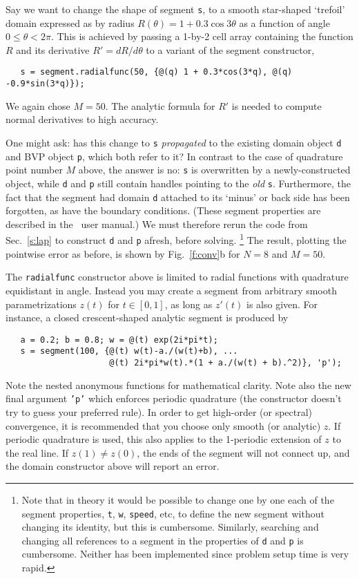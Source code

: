 Say we want to change the shape of segment {\tt s}, to
a smooth star-shaped `trefoil' domain expressed as by radius $R(\theta) =
1 + 0.3\cos 3\theta$ as a function of angle $0\le \theta< 2\pi$.
This is achieved by passing a 1-by-2
cell array containing the function $R$ and its
derivative $R' = dR/d\theta$ to a variant of the segment constructor,
\begin{verbatim}
   s = segment.radialfunc(50, {@(q) 1 + 0.3*cos(3*q), @(q) -0.9*sin(3*q)});
\end{verbatim}
We again chose $M=50$.
The analytic formula for $R'$ is needed to compute normal derivatives
to high accuracy.

One might ask: has this change to {\tt s} {\em propagated}
to the existing domain
object {\tt d} and BVP object {\tt p}, which both refer to it?
In contrast to the case of quadrature point number $M$ above,
the answer is no:
{\tt s} is overwritten by a newly-constructed object, while
{\tt d} and {\tt p} still contain handles pointing to the {\em old}
{\tt s}.
Furthermore, the fact that the segment had domain {\tt d}
attached to its `minus' or back side has been forgotten, as have the
boundary conditions.
(These segment properties are described in the \mpspack\ user manual.)
We must therefore rerun the code from Sec.~\ref{s:lap}
to construct {\tt d} and {\tt p} afresh, before solving.%
  \footnote{Note that in theory it would be possible to
    change one by one each of the segment properties, {\tt t}, {\tt w},
    {\tt speed}, etc, to define the new segment without changing its identity,
    but this is cumbersome. Similarly, searching and changing
    all references to a segment in the properties of {\tt d} and {\tt p}
    is cumbersome. Neither has been implemented since problem setup time is
    very rapid.}
The result, plotting the pointwise error as before,
is shown by Fig.~\ref{f:conv}b for $N=8$ and $M=50$.

The {\tt radialfunc} constructor above is limited to radial functions
with quadrature equidistant
in angle. Instead you may create a segment from arbitrary
smooth parametrizations $z(t)$ for $t \in[0,1]$, as long as $z'(t)$
is also given. For instance, a closed crescent-shaped analytic segment is
produced by 
\begin{verbatim}
   a = 0.2; b = 0.8; w = @(t) exp(2i*pi*t);
   s = segment(100, {@(t) w(t)-a./(w(t)+b), ...
                     @(t) 2i*pi*w(t).*(1 + a./(w(t) + b).^2)}, 'p');
\end{verbatim}
Note the nested anonymous functions for mathematical clarity.
Note also the new final argument {\tt 'p'} which enforces
periodic quadrature (the constructor doesn't try to guess your preferred rule).
In order to get high-order (or spectral) convergence, it is recommended
that you choose only smooth (or analytic) $z$.
If periodic quadrature is used,
this also applies to the 1-periodic extension of $z$ to the real line.
If $z(1)\neq z(0)$, the ends of the segment will not connect
up, and the domain constructor above will report an error.

